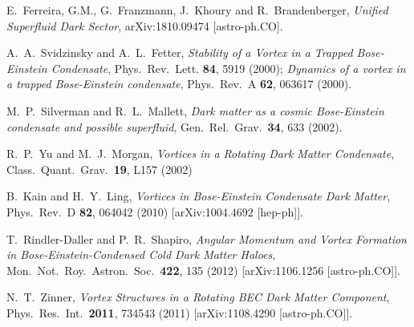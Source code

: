 \documentclass[aps,prd,twocolumn,nofootinbib,superscriptaddress]{revtex4-1}
\begin{document}
\begin{thebibliography}{99}
  E.~Ferreira, G.M., G.~Franzmann, J.~Khoury and R.~Brandenberger,
  \emph{Unified Superfluid Dark Sector},
  arXiv:1810.09474 [astro-ph.CO].


	A.~A.~Svidzinsky and A.~L.~Fetter,
	\emph{Stability of a Vortex in a Trapped Bose-Einstein Condensate},
	Phys.\ Rev.\ Lett. {\bf 84}, 5919 (2000);
	\emph{Dynamics of a vortex in a trapped Bose-Einstein condensate},
	Phys.\ Rev.\ A {\bf 62}, 063617 (2000).

  M.~P.~Silverman and R.~L.~Mallett,
  \emph{Dark matter as a cosmic Bose-Einstein condensate and possible superfluid},
  Gen.\ Rel.\ Grav.\  {\bf 34}, 633 (2002).
  
  R.~P.~Yu and M.~J.~Morgan,
  \emph{Vortices in a Rotating Dark Matter Condensate},
  Class.\ Quant.\ Grav.\ {\bf 19}, L157 (2002)
  
  B.~Kain and H.~Y.~Ling,
  \emph{Vortices in Bose-Einstein Condensate Dark Matter},
  Phys.\ Rev.\ D {\bf 82}, 064042 (2010)
  [arXiv:1004.4692 [hep-ph]].
  
  T.~Rindler-Daller and P.~R.~Shapiro,
  \emph{Angular Momentum and Vortex Formation in Bose-Einstein-Condensed Cold Dark Matter Haloes},
  Mon.\ Not.\ Roy.\ Astron.\ Soc.\  {\bf 422}, 135 (2012)
  [arXiv:1106.1256 [astro-ph.CO]].

  N.~T.~Zinner,
  \emph{Vortex Structures in a Rotating BEC Dark Matter Component},
  Phys.\ Res.\ Int.\  {\bf 2011}, 734543 (2011)
  [arXiv:1108.4290 [astro-ph.CO]].


\end{thebibliography}
\end{document}
